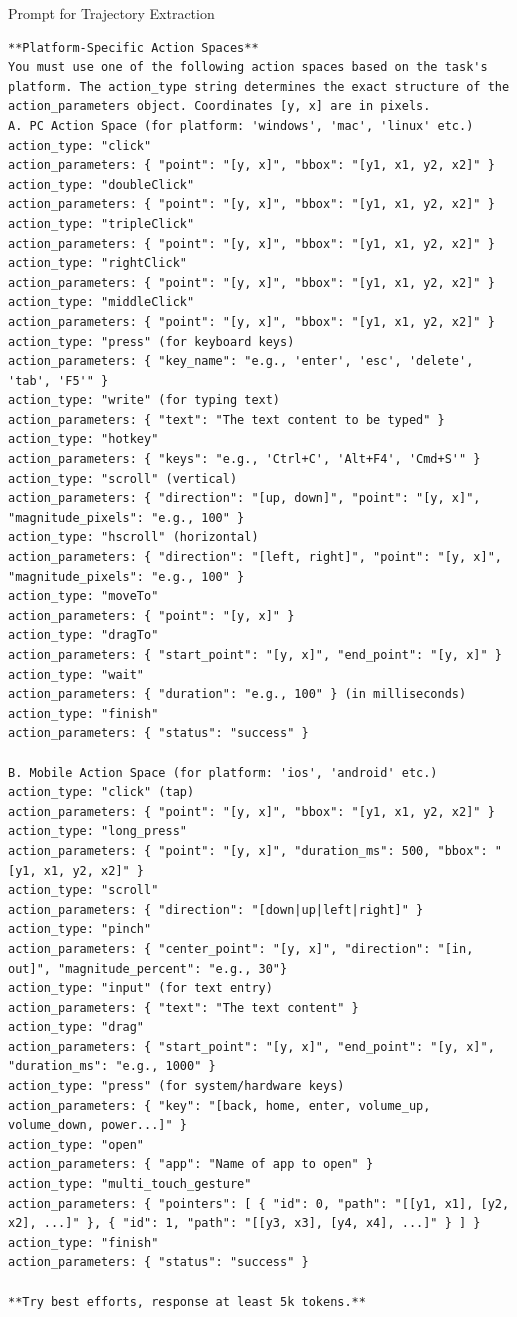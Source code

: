 \documentclass{article}
\theoremstyle{plain}
\theoremstyle{definition}
\theoremstyle{remark}
\begin{document}
\begin{promptbox}{Prompt for Trajectory Extraction}
\begin{lstlisting}
**Platform-Specific Action Spaces**
You must use one of the following action spaces based on the task's platform. The action_type string determines the exact structure of the action_parameters object. Coordinates [y, x] are in pixels.
A. PC Action Space (for platform: 'windows', 'mac', 'linux' etc.)
action_type: "click"
action_parameters: { "point": "[y, x]", "bbox": "[y1, x1, y2, x2]" }
action_type: "doubleClick"
action_parameters: { "point": "[y, x]", "bbox": "[y1, x1, y2, x2]" }
action_type: "tripleClick"
action_parameters: { "point": "[y, x]", "bbox": "[y1, x1, y2, x2]" }
action_type: "rightClick"
action_parameters: { "point": "[y, x]", "bbox": "[y1, x1, y2, x2]" }
action_type: "middleClick"
action_parameters: { "point": "[y, x]", "bbox": "[y1, x1, y2, x2]" }
action_type: "press" (for keyboard keys)
action_parameters: { "key_name": "e.g., 'enter', 'esc', 'delete', 'tab', 'F5'" }
action_type: "write" (for typing text)
action_parameters: { "text": "The text content to be typed" }
action_type: "hotkey"
action_parameters: { "keys": "e.g., 'Ctrl+C', 'Alt+F4', 'Cmd+S'" }
action_type: "scroll" (vertical)
action_parameters: { "direction": "[up, down]", "point": "[y, x]", "magnitude_pixels": "e.g., 100" }
action_type: "hscroll" (horizontal)
action_parameters: { "direction": "[left, right]", "point": "[y, x]", "magnitude_pixels": "e.g., 100" }
action_type: "moveTo"
action_parameters: { "point": "[y, x]" }
action_type: "dragTo"
action_parameters: { "start_point": "[y, x]", "end_point": "[y, x]" }
action_type: "wait"
action_parameters: { "duration": "e.g., 100" } (in milliseconds)
action_type: "finish"
action_parameters: { "status": "success" }

B. Mobile Action Space (for platform: 'ios', 'android' etc.)
action_type: "click" (tap)
action_parameters: { "point": "[y, x]", "bbox": "[y1, x1, y2, x2]" }
action_type: "long_press"
action_parameters: { "point": "[y, x]", "duration_ms": 500, "bbox": "[y1, x1, y2, x2]" }
action_type: "scroll"
action_parameters: { "direction": "[down|up|left|right]" }
action_type: "pinch"
action_parameters: { "center_point": "[y, x]", "direction": "[in, out]", "magnitude_percent": "e.g., 30"}
action_type: "input" (for text entry)
action_parameters: { "text": "The text content" }
action_type: "drag"
action_parameters: { "start_point": "[y, x]", "end_point": "[y, x]", "duration_ms": "e.g., 1000" }
action_type: "press" (for system/hardware keys)
action_parameters: { "key": "[back, home, enter, volume_up, volume_down, power...]" }
action_type: "open"
action_parameters: { "app": "Name of app to open" }
action_type: "multi_touch_gesture"
action_parameters: { "pointers": [ { "id": 0, "path": "[[y1, x1], [y2, x2], ...]" }, { "id": 1, "path": "[[y3, x3], [y4, x4], ...]" } ] }
action_type: "finish"
action_parameters: { "status": "success" }

**Try best efforts, response at least 5k tokens.**
\end{lstlisting}
\end{promptbox}
\end{document}
